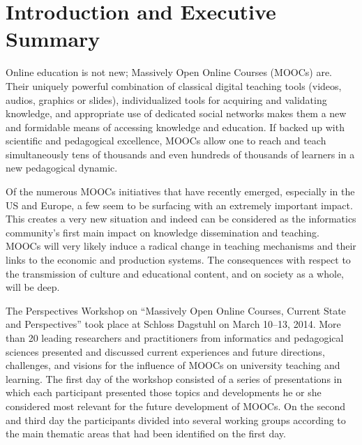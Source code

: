 \section{Introduction and Executive Summary}


Online education is not new; Massively Open Online Courses (MOOCs)
are. Their uniquely powerful combination of classical digital teaching
tools (videos, audios, graphics or slides), individualized tools for
acquiring and validating knowledge, and appropriate use of dedicated
social networks makes them a new and formidable means of accessing
knowledge and education. If backed up with scientific and pedagogical
excellence, MOOCs allow one to reach and teach simultaneously tens of
thousands and even hundreds of thousands of learners in a new
pedagogical dynamic.

Of the numerous MOOCs initiatives that have recently emerged, especially
in the US and Europe, a few seem to be surfacing with an extremely
important impact. This creates a very new situation and indeed can be
considered as the informatics community's first main impact on knowledge
dissemination and teaching. MOOCs will very likely induce a radical
change in teaching mechanisms and their links to the economic and
production systems. The consequences with respect to the transmission of
culture and educational content, and on society as a whole, will be
deep.

The Perspectives Workshop on ``Massively Open Online Courses, Current
State and Perspectives'' took place at Schloss Dagstuhl on March 10--13,
2014. More than 20 leading researchers and practitioners from
informatics and pedagogical sciences presented and discussed current
experiences and future directions, challenges, and visions for the
influence of MOOCs on university teaching and learning.  The first day
of the workshop consisted of a series of presentations in which each
participant presented those topics and developments he or she considered
most relevant for the future development of MOOCs. On the second and
third day the participants divided into several working groups according
to the main thematic areas that had been identified on the first day.


